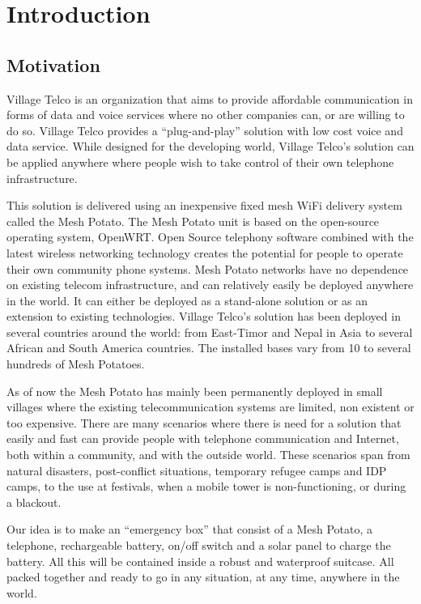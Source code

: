 \chapter{Introduction}
\label{chp:introduction} 

\section{Motivation}
Village Telco is an organization that aims to provide affordable communication in forms of data and voice services where no other companies can, or are willing to do so. Village Telco provides a “plug-and-play” solution with low cost voice and data service. While designed for the developing world, Village Telco’s solution can be applied anywhere where people wish to take control of their own telephone infrastructure.

This solution is delivered using an inexpensive fixed mesh WiFi delivery system called the Mesh Potato. The Mesh Potato unit is based on the open-source operating system, OpenWRT. Open Source telephony software combined with the latest wireless networking technology creates the potential for people to operate their own community phone systems. Mesh Potato networks have no dependence on existing telecom infrastructure, and can relatively easily be deployed anywhere in the world. It can either be deployed as a stand-alone solution or as an extension to existing technologies. Village Telco’s solution has been deployed in several countries around the world: from East-Timor and Nepal in Asia to several African and South America countries. The installed bases vary from 10 to several hundreds of Mesh Potatoes. 

As of now the Mesh Potato has mainly been permanently deployed in small villages where the existing telecommunication systems are limited, non existent or too expensive. There are many scenarios where there is need for a solution that easily and fast can provide people with telephone communication and Internet, both within a community, and with the outside world. These scenarios span from natural disasters, post-conflict situations, temporary refugee camps and IDP camps, to the use at festivals, when a mobile tower is non-functioning, or during a blackout. 

Our idea is to make an “emergency box” that consist of a Mesh Potato, a telephone, rechargeable battery, on/off switch and a solar panel to charge the battery. All this will be contained inside a robust and waterproof suitcase. All packed together and ready to go in any situation, at any time, anywhere in the world. 

